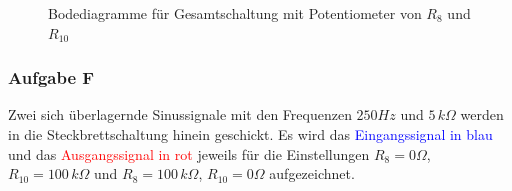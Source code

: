 \begin{figure}[h]
{  \label{1_0SB}}
%
\caption{Bodediagramme für Gesamtschaltung mit Potentiometer von $R_{8}$ und $R_{10}$}
\end{figure}
\newpage

\subsubsection{Aufgabe F}
\label{F}
Zwei sich überlagernde Sinussignale mit den Frequenzen $\si{250}{Hz}$ und $\si{5}{\,k\Omega}$ werden in die Steckbrettschaltung hinein geschickt. Es wird das \textcolor{blue}{Eingangssignal in blau} und das \textcolor{red}{Ausgangssignal in rot} jeweils für die Einstellungen $R_{8}=\si{0}{\Omega}$, $R_{10}=\si{100}{\,k\Omega}$ und $R_{8}=\si{100}{\,k\Omega}$, $R_{10}=\si{0}{\Omega}$ aufgezeichnet.

